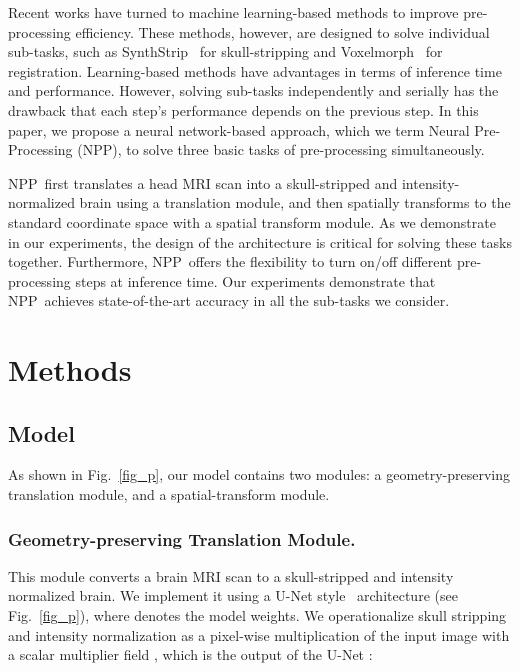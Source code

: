 \documentclass[runningheads]{llncs}
\newcommand{\modelname}{NPP}
\begin{document}
Recent works have turned to machine learning-based methods to improve pre-processing efficiency. 
These methods, however, are designed to solve individual sub-tasks, such as SynthStrip~\cite{hoopes2022synthstrip} for skull-stripping and Voxelmorph~\cite{Balakrishnan2019} for registration. 
Learning-based methods have advantages in terms of inference time and performance.
However, solving sub-tasks independently and serially has the drawback that each step's performance depends on the previous step.
In this paper, we propose a neural network-based approach, which we term Neural Pre-Processing (\modelname), to solve three basic tasks of pre-processing simultaneously. 





\modelname~first translates a head MRI scan into a skull-stripped and intensity-normalized brain using a translation module, and then spatially transforms to the standard coordinate space with a spatial transform module. 
As we demonstrate in our experiments, the design of the architecture is critical for solving these tasks together.
Furthermore, \modelname~offers the flexibility to turn on/off different pre-processing steps at inference time.
Our experiments demonstrate that \modelname~achieves state-of-the-art accuracy in all the sub-tasks we consider.





\section{Methods}


\subsection{Model}

As shown in Fig.~\ref{fig_p}, our model contains two modules: a geometry-preserving translation module, and a spatial-transform module. 


\subsubsection{Geometry-preserving Translation Module.}
\label{sec:intensity-module} This module converts a brain MRI scan to a skull-stripped and intensity normalized brain. 
We implement it using a U-Net style~\cite{ronneberger2015u}  architecture (see Fig.~\ref{fig_p}), where  denotes the model weights. 
We operationalize skull stripping and intensity normalization as a pixel-wise multiplication of the input image with a scalar multiplier field , which is the output of the U-Net : 
\end{document}
